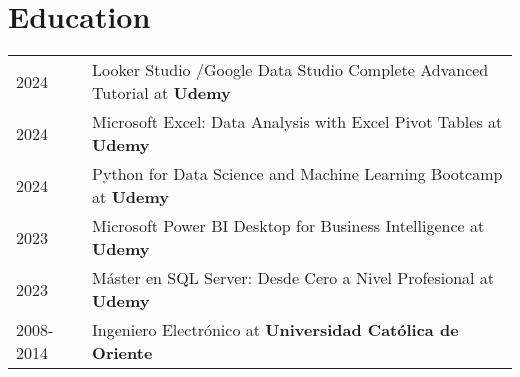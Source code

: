 \documentclass[a4paper,12pt]{article}
\begin{document}
\section{Education}
\begin{tabularx}{\linewidth}{@{}l X@{}}	
2024 & Looker Studio /Google Data Studio Complete Advanced Tutorial at \textbf{Udemy} \hfill \normalsize \\

2024 & Microsoft Excel: Data Analysis with Excel Pivot Tables at \textbf{Udemy} \hfill  \\ 

2024 & Python for Data Science and Machine Learning Bootcamp at \textbf{Udemy} \hfill   \\

2023 & Microsoft Power BI Desktop for Business Intelligence at \textbf{Udemy} \hfill   \\

2023 & Máster en SQL Server: Desde Cero a Nivel Profesional at \textbf{Udemy} \hfill   \\

2008-2014 & Ingeniero Electrónico at \textbf{Universidad Católica de Oriente} \hfill \\
\end{tabularx}




\vfill
{}
\end{document}
